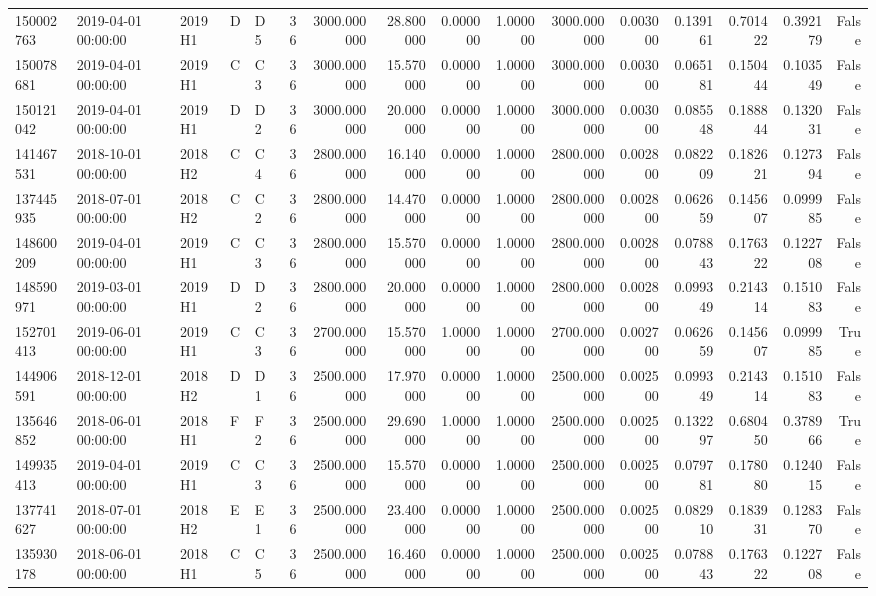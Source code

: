 \begin{tabular}{lllllrrrrrrrrrrr}
150002763 & 2019-04-01 00:00:00 & 2019H1 & D & D5 & 36 & 3000.000000 & 28.800000 & 0.000000 & 1.000000 & 3000.000000 & 0.003000 & 0.139161 & 0.701422 & 0.392179 & False \\
150078681 & 2019-04-01 00:00:00 & 2019H1 & C & C3 & 36 & 3000.000000 & 15.570000 & 0.000000 & 1.000000 & 3000.000000 & 0.003000 & 0.065181 & 0.150444 & 0.103549 & False \\
150121042 & 2019-04-01 00:00:00 & 2019H1 & D & D2 & 36 & 3000.000000 & 20.000000 & 0.000000 & 1.000000 & 3000.000000 & 0.003000 & 0.085548 & 0.188844 & 0.132031 & False \\
141467531 & 2018-10-01 00:00:00 & 2018H2 & C & C4 & 36 & 2800.000000 & 16.140000 & 0.000000 & 1.000000 & 2800.000000 & 0.002800 & 0.082209 & 0.182621 & 0.127394 & False \\
137445935 & 2018-07-01 00:00:00 & 2018H2 & C & C2 & 36 & 2800.000000 & 14.470000 & 0.000000 & 1.000000 & 2800.000000 & 0.002800 & 0.062659 & 0.145607 & 0.099985 & False \\
148600209 & 2019-04-01 00:00:00 & 2019H1 & C & C3 & 36 & 2800.000000 & 15.570000 & 0.000000 & 1.000000 & 2800.000000 & 0.002800 & 0.078843 & 0.176322 & 0.122708 & False \\
148590971 & 2019-03-01 00:00:00 & 2019H1 & D & D2 & 36 & 2800.000000 & 20.000000 & 0.000000 & 1.000000 & 2800.000000 & 0.002800 & 0.099349 & 0.214314 & 0.151083 & False \\
152701413 & 2019-06-01 00:00:00 & 2019H1 & C & C3 & 36 & 2700.000000 & 15.570000 & 1.000000 & 1.000000 & 2700.000000 & 0.002700 & 0.062659 & 0.145607 & 0.099985 & True \\
144906591 & 2018-12-01 00:00:00 & 2018H2 & D & D1 & 36 & 2500.000000 & 17.970000 & 0.000000 & 1.000000 & 2500.000000 & 0.002500 & 0.099349 & 0.214314 & 0.151083 & False \\
135646852 & 2018-06-01 00:00:00 & 2018H1 & F & F2 & 36 & 2500.000000 & 29.690000 & 1.000000 & 1.000000 & 2500.000000 & 0.002500 & 0.132297 & 0.680450 & 0.378966 & True \\
149935413 & 2019-04-01 00:00:00 & 2019H1 & C & C3 & 36 & 2500.000000 & 15.570000 & 0.000000 & 1.000000 & 2500.000000 & 0.002500 & 0.079781 & 0.178080 & 0.124015 & False \\
137741627 & 2018-07-01 00:00:00 & 2018H2 & E & E1 & 36 & 2500.000000 & 23.400000 & 0.000000 & 1.000000 & 2500.000000 & 0.002500 & 0.082910 & 0.183931 & 0.128370 & False \\
135930178 & 2018-06-01 00:00:00 & 2018H1 & C & C5 & 36 & 2500.000000 & 16.460000 & 0.000000 & 1.000000 & 2500.000000 & 0.002500 & 0.078843 & 0.176322 & 0.122708 & False \\

\end{tabular}
